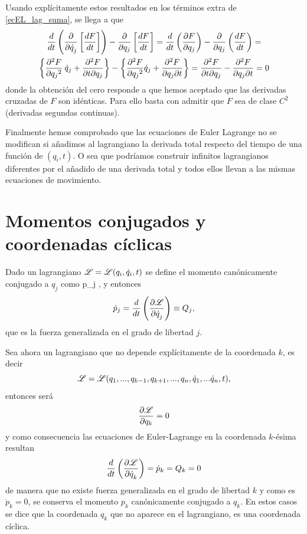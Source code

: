 \documentclass[10pt,oneside]{CBFT_book}
\begin{document}
Usando explícitamente estos resultados en los términos extra de \eqref{ecEL_lag_suma}, se llega 
a que 
\begin{multline*}
 	\dtot{}{t}\left(\dpar{}{\dot{q}_j}\left[ \dtot{F}{t} \right]\right) 
	- \dpar{}{q_j}\left[ \dtot{F}{t}\right] =
	\dtot{}{t}\left( \dpar{F}{q_j} \right) - \dpar{}{q_j}\left( \dtot{F}{t}\right) = \\
	\left\{ \dpar[2]{F}{q_j} \: \dot{q}_j + \dparcru{F}{q_j}{t} \right\}%
	- \left\{ \dpar[2]{F}{q_j} \dot{q}_j + \dparcru{F}{t}{q_j} \right\} =
	\dparcru{F}{q_j}{t} - \dparcru{F}{t}{q_j} = 0
\end{multline*}
donde la obtención del cero responde a que hemos aceptado que las derivadas cruzadas de $F$ son idénticas.
Para ello basta con admitir que $F$ sea de clase $C^2$ (derivadas segundas continuas).

Finalmente hemos comprobado que las ecuaciones de Euler Lagrange no se modifican si añadimos al lagrangiano la 
derivada total respecto del tiempo de una función de $(q_i,t)$.
O sea que podríamos construir infinitos lagrangianos diferentes por el añadido de una derivada total y todos
ellos llevan a las mismas ecuaciones de movimiento.

\section{Momentos conjugados y coordenadas cíclicas} 

Dado un lagrangiano $\mathscr{L} = \mathscr{L}( q_i,\dot{q}_i, t )$ se define el momento canónicamente conjugado a $q_j$
como 
\be
	p_j \equiv {},
	\label{mom_canon_conj}
\ee
y entonces 
\[
	\dot{p}_j = \frac{d}{dt}\left( \frac{\partial^{\hspace{-0.05em}} {\mathscr{L}}}{\partial {\dot{q}_j}^{\hspace{-0.05em}}} \right) \equiv Q_j,
\]
que es la fuerza generalizada en el grado de libertad $j$.

Sea ahora un lagrangiano que no depende explícitamente de la coordenada $k$, es decir 
\[
	\mathscr{L} = \mathscr{L}( q_1,...,q_{k-1},q_{k+1},...,q_n,\dot{q}_1,...\dot{q}_n, t ),
\]
entonces será
\[
	\frac{\partial^{\hspace{-0.05em}} {\mathscr{L}}}{\partial {q_k}^{\hspace{-0.05em}}}= 0 
\]
y como consecuencia las ecuaciones de Euler-Lagrange en la coordenada $k$-ésima resultan 
\[
	\frac{d^{\hspace{-0.05em}} {}}{d {t}^{\hspace{-0.05em}}}\left( \frac{\partial^{\hspace{-0.05em}} {\mathscr{L}}}{\partial {\dot{q}_k}^{\hspace{-0.05em}}} \right) = \dot{ p }_k = Q_k = 0 
\]
de manera que no existe fuerza generalizada en el grado de libertad $k$ y como es $\dot{p}_k = 0$, se conserva 
el momento $p_k$ canónicamente conjugado a $q_k$.
En estos casos se dice que la coordenada $q_k$ que no aparece en el lagrangiano, es una coordenada
cíclica.
\end{document}

